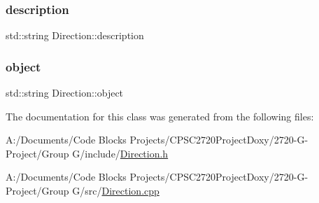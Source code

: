\mbox{\label{class_direction_a6fe5ae36646ffd423ba6b5ea927de6ca}} 
\subsubsection{\texorpdfstring{description}{description}}
{\footnotesize\ttfamily std\+::string Direction\+::description\hspace{0.3cm}{\ttfamily [protected]}}

\mbox{\label{class_direction_a7be78cb6b0af751a6cfa0808dc91cd6e}} 
\subsubsection{\texorpdfstring{object}{object}}
{\footnotesize\ttfamily std\+::string Direction\+::object\hspace{0.3cm}{\ttfamily [protected]}}



The documentation for this class was generated from the following files\+:\begin{DoxyCompactItemize}
\item 
A\+:/\+Documents/\+Code Blocks Projects/\+C\+P\+S\+C2720\+Project\+Doxy/2720-\/\+G-\/\+Project/\+Group G/include/\mbox{\hyperlink{_direction_8h}{Direction.\+h}}\item 
A\+:/\+Documents/\+Code Blocks Projects/\+C\+P\+S\+C2720\+Project\+Doxy/2720-\/\+G-\/\+Project/\+Group G/src/\mbox{\hyperlink{_direction_8cpp}{Direction.\+cpp}}\end{DoxyCompactItemize}
